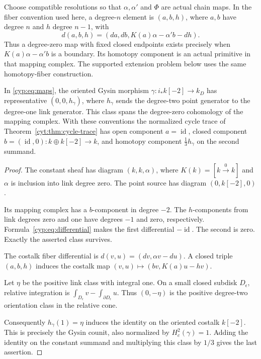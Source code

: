 Choose compatible resolutions so that \(\alpha,\alpha'\)
and \(\Phi\) are actual chain maps. In the fiber convention
used here, a degree-\(n\) element is \((a,b,h)\), where
\(a,b\) have degree \(n\) and \(h\) degree \(n-1\), with
\begin{equation}\label{cyp:eq:differential}
 d(a,b,h)=(da,db,K(a)\alpha-\alpha'b-dh).
\end{equation}
Thus a degree-zero map with fixed closed endpoints exists
precisely when \(K(a)\alpha-\alpha'b\) is a boundary.
Its homotopy component is an actual primitive in that
mapping complex. The supported extension problem below uses the same
homotopy-fiber construction.

\begin{proposition}\label{cyp:prop:gysin}
In \eqref{cyp:eq:maps}, the oriented Gysin morphism
\(\gamma:i_*k[-2]\to k_D\) has representative
\((0,0,h_\gamma)\), where \(h_\gamma\) sends the degree-two
point generator to the degree-one link generator.
This class spans the degree-zero cohomology of the mapping
complex. With these conventions the normalized cycle trace
of Theorem~\ref{cyt:thm:cycle-trace} has open component
\(a=\operatorname{id}\), closed component
\(b=(\operatorname{id},0):k\oplus k[-2]\to k\),
and homotopy component \(\tfrac13h_\gamma\) on the second
summand.
\end{proposition}

\begin{proof}
The constant sheaf has diagram \((k,k,\alpha)\), where
\(K(k)=[k\xrightarrow0 k]\) and \(\alpha\) is inclusion
into link degree zero. The point source has diagram
\((0,k[-2],0)\).

Its mapping complex has a \(b\)-component in degree \(-2\).
The \(h\)-components from link degrees zero and one have
degrees \(-1\) and zero, respectively. Formula~\eqref{cyp:eq:differential} makes the
first differential \(-\operatorname{id}\). The second is
zero. Exactly the asserted class survives.

The costalk fiber differential is \(d(v,u)=(dv,\alpha v-du)\).
A closed triple \((a,b,h)\) induces the costalk map
\((v,u)\mapsto(bv,K(a)u-hv)\).

Let \(\eta\) be the positive link class with integral one.
On a small closed subdisk \(D_\epsilon\), relative
integration is \(\int_{D_\epsilon}v-\int_{\partial D_\epsilon}u\).
Thus \((0,-\eta)\) is the positive degree-two orientation
class in the relative cone.

Consequently \(h_\gamma(1)=\eta\) induces the identity on the
oriented costalk \(k[-2]\). This is precisely the Gysin
counit, also normalized by \(H_c^2(\gamma)=1\).
Adding the identity on the constant summand and multiplying
this class by \(1/3\) gives the last assertion.
\end{proof}

